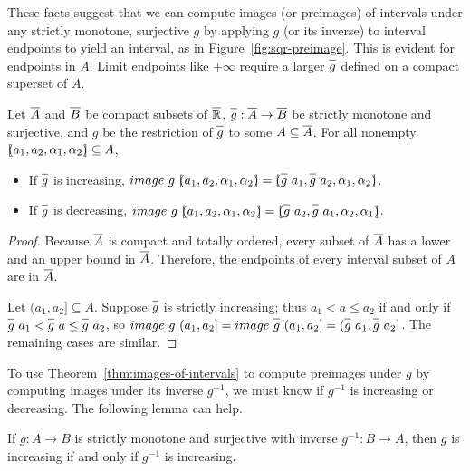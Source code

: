 These facts suggest that we can compute images (or preimages) of intervals under any strictly monotone, surjective $g$ by applying $g$ (or its inverse) to interval endpoints to yield an interval, as in Figure~\ref{fig:sqr-preimage}.
This is evident for endpoints in $A$.
Limit endpoints like $+\infty$ require a larger $\cl{g}$ defined on a compact superset of $A$.

\begin{theorem}
\label{thm:images-of-intervals}
Let $\cl{A}$ and $\cl{B}$ be compact subsets of $\cl{\Re}$, $\cl{g} : \cl{A} \to \cl{B}$ be strictly monotone and surjective, and $g$ be the restriction of $\cl{g}$ to some $A \subseteq \cl{A}$.
For all nonempty $[\mspace{-4.5mu}(a_1,a_2,\alpha_1,\alpha_2)\mspace{-4.5mu}] \subseteq A$,
\begin{itemize}
	\item If $\cl{g}$ is increasing, $image~g~\ivl{a_1,a_2,\alpha_1,\alpha_2} = \ivl{\cl{g}~a_1, \cl{g}~a_2,\alpha_1,\alpha_2}$.
	\item If $\cl{g}$ is decreasing, $image~g~\ivl{a_1,a_2,\alpha_1,\alpha_2} = \ivl{\cl{g}~a_2, \cl{g}~a_1,\alpha_2,\alpha_1}$.
\end{itemize}
\end{theorem}
\begin{proof}
Because $\cl{A}$ is compact and totally ordered, every subset of $\cl{A}$ has a lower and an upper bound in $\cl{A}$.
Therefore, the endpoints of every interval subset of $A$ are in $\cl{A}$.

Let $(a_1,a_2] \subseteq A$.
Suppose $\cl{g}$ is strictly increasing; thus $a_1 < a \leq a_2$ if and only if $\cl{g}~a_1 < \cl{g}~a \leq \cl{g}~a_2$, so $image~g~(a_1,a_2] = image~\cl{g}~(a_1,a_2] = (\cl{g}~a_1,\cl{g}~a_2]$.
The remaining cases are similar.
\end{proof}

To use Theorem~\ref{thm:images-of-intervals} to compute preimages under $g$ by computing images under its inverse $g^{-1}$, we must know if $g^{-1}$ is increasing or decreasing.
The following lemma can help.

\begin{lemma}
\label{lem:inverse-direction}
If $g : A \to B$ is strictly monotone and surjective with inverse $g^{-1} : B \to A$, then $g$ is increasing if and only if $g^{-1}$ is increasing.
\end{lemma}


